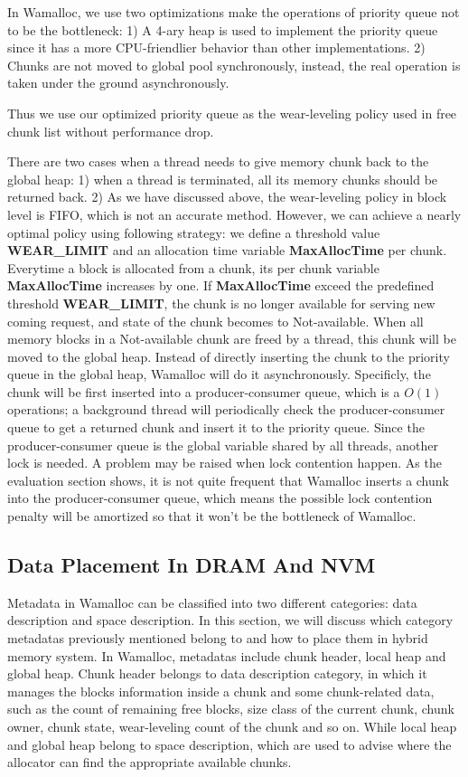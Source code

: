 \documentclass{vldb}
\begin{document}
In Wamalloc, we use two optimizations make the operations of priority queue not to be the bottleneck:
1) A 4-ary heap is used to implement the priority queue since it has a more CPU-friendlier behavior than other implementations.
2) Chunks are not moved to global pool synchronously, instead, the real operation is taken under the ground asynchronously.

Thus we use our optimized priority queue as the wear-leveling policy used in free chunk list without performance drop.

There are two cases when a thread needs to give memory chunk back to the global heap: 
1) when a thread is terminated, all its memory chunks should be returned back.
2) As we have discussed above, the wear-leveling policy in block level is FIFO, which is not an accurate method.
However, we can achieve a nearly optimal policy using following strategy: 
we define a threshold value \textbf{WEAR\_LIMIT} and an allocation time variable \textbf{MaxAllocTime} per chunk. 
Everytime a block is allocated from a chunk, its per chunk variable \textbf{MaxAllocTime} increases by one.
If \textbf{MaxAllocTime} exceed the predefined threshold \textbf{WEAR\_LIMIT}, 
the chunk is no longer available for serving new coming request, and state of the chunk becomes to Not-available.
When all memory blocks in a Not-available chunk are freed by a thread, this chunk will be moved to the global heap.
Instead of directly inserting the chunk to the priority queue in the global heap, Wamalloc will do it asynchronously.
Specificly, the chunk will be first inserted into a producer-consumer queue, which is a $O(1)$ operations;
a background thread will periodically check the producer-consumer queue to get a returned chunk and insert it to the priority queue.
Since the producer-consumer queue is the global variable shared by all threads, another lock is needed.
A problem may be raised when lock contention happen.
As the evaluation section shows, it is not quite frequent that Wamalloc inserts a chunk into the producer-consumer queue,
which means the possible lock contention penalty will be amortized so that it won't be the bottleneck of Wamalloc.

\subsection{Data Placement In DRAM And NVM}

Metadata in Wamalloc can be classified into two different categories: data description and space description.
In this section, we will discuss which category metadatas previously mentioned belong to and how to place them in hybrid memory system.
In Wamalloc, metadatas include chunk header, local heap and global heap.
Chunk header belongs to data description category, 
in which it manages the blocks information inside a chunk and some chunk-related data, 
such as the count of remaining free blocks, size class of the current chunk,
chunk owner, chunk state, wear-leveling count of the chunk and so on.
While local heap and global heap belong to space description,
which are used to advise where the allocator can find the appropriate available chunks.
\end{document}
